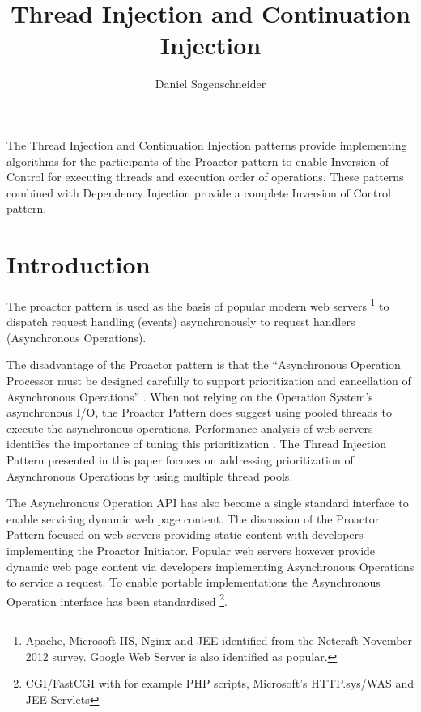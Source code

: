 \documentclass{article}
\begin{document}
\title{Thread Injection and Continuation Injection}
\author{Daniel Sagenschneider}
\date{}
\maketitle

\abstract{}
The Thread Injection and Continuation Injection patterns provide implementing
algorithms for the participants of the Proactor pattern to enable Inversion of
Control for executing threads and execution order of operations.  These patterns
combined with Dependency Injection provide a complete Inversion of Control
pattern.

\section{Introduction}

The proactor pattern \cite{proactor} is used as the basis of popular modern web
servers \footnote{Apache, Microsoft IIS, Nginx and JEE identified from the
Netcraft November 2012 survey.  Google Web Server is also identified as
popular.} to dispatch request handling (events) asynchronously to request
handlers (Asynchronous Operations).

The disadvantage of the Proactor pattern is that the ``Asynchronous Operation
Processor must be designed carefully to support prioritization and cancellation
of Asynchronous Operations'' \cite{proactor}.  When not relying on the Operation
System's asynchronous I/O, the Proactor Pattern does suggest using pooled
threads to execute the asynchronous operations.  Performance analysis of web
servers identifies the importance of tuning this prioritization
\cite{tuning-important,low-server-footprint,tuning-os-important}.  The Thread
Injection Pattern presented in this paper focuses on addressing prioritization
of Asynchronous Operations by using multiple thread pools.

The Asynchronous Operation API has also become a single standard interface to
enable servicing dynamic web page content.  The discussion of the Proactor
Pattern focused on web servers providing static content with developers
implementing the Proactor Initiator.  Popular web servers however provide
dynamic web page content via developers implementing Asynchronous Operations to
service a request.  To enable portable implementations the Asynchronous
Operation interface has been standardised \footnote{CGI/FastCGI with for
example PHP scripts, Microsoft's HTTP.sys/WAS and JEE Servlets}.
\end{document}
